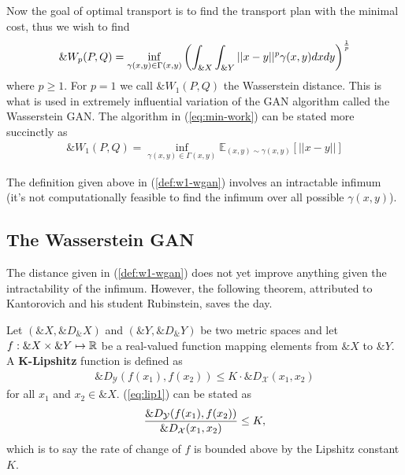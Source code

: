 Now the goal of optimal transport is to find the transport plan with
the minimal cost, thus we wish to find
\begin{align}
  \label{eq:min-work}
  \&W_p(P, Q) = \inf_{\gamma(x,y) \in \Gamma(x,y)} \left( \int_{\&X}\int_{\&Y}||x-y||^p\gamma(x, y)dxdy \right)^{1 \over p}
\end{align}
where $p \geq 1$. For $p=1$ we call $\&W_1(P, Q)$ the Wasserstein
distance. This is what is used in extremely influential variation of
the GAN algorithm called the Wasserstein GAN. The algorithm in
(\ref{eq:min-work}) can be stated more succinctly as
\begin{align}
  \label{def:w1-wgan}
  \&W_1(P, Q) = \inf_{\gamma(x, y) \in \Gamma(x,y)}\mathbb{E}_{(x,y) \sim \gamma(x, y)} \left[ || x-y || \right]
\end{align}
\begin{remark}
  The definition given above in (\ref{def:w1-wgan}) involves an
  intractable infimum (it's not computationally feasible to find the
  infimum over all possible $\gamma(x, y)$).
\end{remark}

\subsection{The Wasserstein GAN}

The distance given in (\ref{def:w1-wgan}) does not yet improve
anything given the intractability of the infimum. However, the
following theorem, attributed to Kantorovich and his student
Rubinstein, saves the day.

\begin{definition}
  Let $(\&X, \&D_\&X)$ and $(\&Y, \&D_\&Y)$ be two metric spaces and
  let $f: \&X \times \&Y \mapsto \mathbb{R}$ be a real-valued function mapping
  elements from $\&X$ to $\&Y$. A \textbf{K-Lipshitz} function is
  defined as
  \begin{align}
    \label{eq:lip1}
    \&D_{\mathcal{Y}}(f(x_1), f(x_2)) \leq K \cdot {\&D}_{\mathcal{X}}(x_1, x_2)
  \end{align}
  for all $x_1$ and $x_2 \in \&X$. (\ref{eq:lip1}) can be stated as
  \begin{align}
    {\&D_{\mathcal{Y}}(f(x_1), f(x_2)) \over \&D_{\mathcal{X}}(x_1, x_2)} \leq K,
  \end{align}
  which is to say the rate of change of $f$ is bounded above by the
  Lipshitz constant $K$.
\end{definition}

